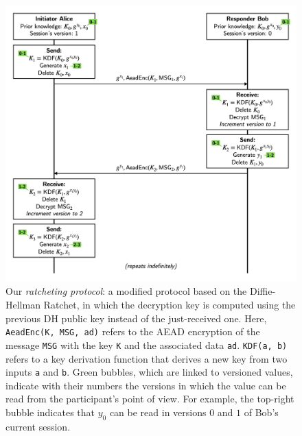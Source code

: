 \begin{figure}
    \centering
    \includegraphics[width=1.0\textwidth]{figures/DH-ratchet-modified.png}
    \caption{Our \emph{ratcheting protocol}: a modified protocol based on the Diffie-Hellman Ratchet, in which the decryption key is computed using the previous DH public key instead of the just-received one.
    Here, \texttt{AeadEnc(K, MSG, ad)} refers to the AEAD encryption of the message \texttt{MSG} with the key \texttt{K} and the associated data \texttt{ad}. \texttt{KDF(a, b)} refers to a key derivation function that derives a new key from two inputs \texttt{a} and \texttt{b}.
    Green bubbles, which are linked to versioned values, indicate with their numbers the versions in which the value can be read from the participant's point of view. For example, the top-right bubble indicates that $y_0$ can be read in versions $0$ and $1$ of Bob's current session.}
    \label{fig:dh-ratchet-modified}
\end{figure}

